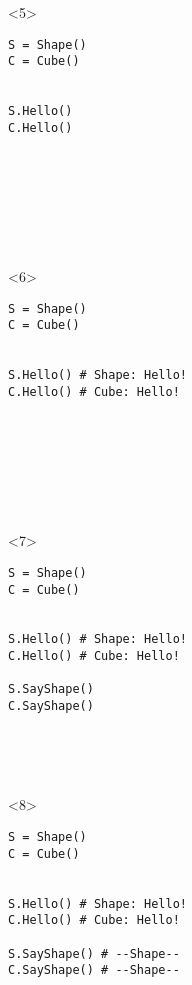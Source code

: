 \begin{frame}[fragile]{}
\begin{columns}[onlytextwidth]
\begin{column}{0.47\textwidth}
\begin{onlyenv}
\begin{lstlisting}[style=python,basicstyle=\ttfamily\footnotesize]
 \end{lstlisting}
      \end{onlyenv}

      \begin{onlyenv}<5>
        \begin{lstlisting}[style=python,basicstyle=\ttfamily\footnotesize]
S = Shape()
C = Cube()


S.Hello()
C.Hello()








 \end{lstlisting}
      \end{onlyenv}

      \begin{onlyenv}<6>
        \begin{lstlisting}[style=python,basicstyle=\ttfamily\footnotesize]
S = Shape()
C = Cube()


S.Hello() # Shape: Hello!
C.Hello() # Cube: Hello!








 \end{lstlisting}
      \end{onlyenv}

      \begin{onlyenv}<7>
        \begin{lstlisting}[style=python,basicstyle=\ttfamily\footnotesize]
S = Shape()
C = Cube()


S.Hello() # Shape: Hello!
C.Hello() # Cube: Hello!

S.SayShape()
C.SayShape()





 \end{lstlisting}
      \end{onlyenv}

      \begin{onlyenv}<8>
        \begin{lstlisting}[style=python,basicstyle=\ttfamily\footnotesize]
S = Shape()
C = Cube()


S.Hello() # Shape: Hello!
C.Hello() # Cube: Hello!

S.SayShape() # --Shape--
C.SayShape() # --Shape--





 \end{lstlisting}
      \end{onlyenv}


\end{column}
\end{columns}
\end{frame}
